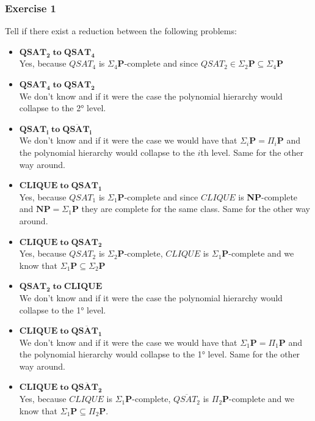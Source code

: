 \subsubsection{Exercise 1}
Tell if there exist a reduction between the following problems:
\begin{itemize}
    \item $\mathbf{QSAT_2 \; to \; QSAT_4}$\\
    Yes, because $QSAT_4$ is $\Sigma_4\mathbf{P}$-complete and since $QSAT_2\in\Sigma_2\mathbf{P}\subseteq\Sigma_4\mathbf{P}$
    \item $\mathbf{QSAT_4 \; to \; QSAT_2}$\\
    We don't know and if it were the case the polynomial hierarchy would collapse to the 2° level.
    \item $\mathbf{QSAT_i \; to \; \overline{QSAT_i}}$\\
    We don't know and if it were the case we would have that $\Sigma_i\mathbf{P}=\Pi_i\mathbf{P}$ and the polynomial hierarchy would collapse to the $i$th level.
    Same for the other way around.
    \item $\mathbf{CLIQUE \; to \; QSAT_1}$\\
    Yes, because $QSAT_1$ is $\Sigma_1\mathbf{P}$-complete and since $CLIQUE$ is \textbf{NP}-complete and $\textbf{NP}=\Sigma_1\mathbf{P}$ they are complete for the same class. Same for the other way around.
    \item $\mathbf{CLIQUE \; to \; QSAT_2}$\\
    Yes, because $QSAT_2$ is $\Sigma_2\mathbf{P}$-complete, $CLIQUE$ is $\Sigma_1\mathbf{P}$-complete and we know that $\Sigma_1\mathbf{P}\subseteq\Sigma_2\mathbf{P}$ 
    \item $\mathbf{QSAT_2 \; to \; CLIQUE}$\\
    We don't know and if it were the case the polynomial hierarchy would collapse to the 1° level.
    \item $\mathbf{CLIQUE \; to \; \overline{QSAT_1}}$\\
    We don't know and if it were the case we would have that $\Sigma_1\mathbf{P}=\Pi_1\mathbf{P}$ and the polynomial hierarchy would collapse to the 1° level. Same for the other way around.
    \item $\mathbf{CLIQUE \; to \; \overline{QSAT_2}}$\\
    Yes, because $CLIQUE$ is $\Sigma_1\mathbf{P}$-complete, $\overline{QSAT_2}$ is $\Pi_2\mathbf{P}$-complete and we know that $\Sigma_1\mathbf{P}\subseteq\Pi_2\mathbf{P}$.

\end{itemize}
